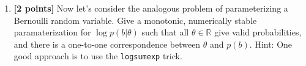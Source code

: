 \documentclass{harvardml}
\theoremstyle{plain}
\begin{document}
\begin{problem}
\begin{enumerate}[label=(\alph*)]
\item {\bf [2 points]} Now let's consider the analogous problem of parameterizing a Bernoulli random variable.
Give a monotonic, numerically stable paramaterization for $\log p(b | \theta)$ such that all $\theta \in \mathbb{R}$ give valid probabilities, and there is a one-to-one correspondence between $\theta$ and $p(b)$.
Hint: One good approach is to use the \texttt{logsumexp} trick.
\end{enumerate}

\end{problem}




\end{document}
